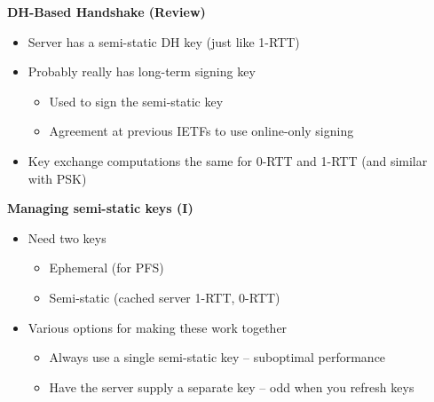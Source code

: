 \documentclass[helvetica]{seminar}
\newcommand{\heading}[1]{%
  \begin{center} 
    \large\bf 
    #1 
  \end{center} 
  \vspace{.4 in}}
\begin{document}
\begin{slide}
\heading{DH-Based Handshake (Review)}

\begin{itemize}
\item Server has a semi-static DH key (just like 1-RTT)
\item Probably really has long-term signing key
  \begin{itemize}
  \item Used to sign the semi-static key
  \item Agreement at previous IETFs to use online-only signing
  \end{itemize}

\item Key exchange computations the same for 0-RTT and 1-RTT (and similar with PSK)
\end{itemize}
\end{slide}



\begin{slide}
\heading{Managing semi-static keys (I)}

\begin{itemize}
\item Need two keys
  \begin{itemize}
  \item Ephemeral (for PFS)
  \item Semi-static (cached server 1-RTT, 0-RTT)
  \end{itemize}

\item Various options for making these work together
  \begin{itemize}
  \item Always use a single semi-static key -- suboptimal performance
  \item Have the server supply a separate key -- odd when you refresh keys
  \end{itemize}
\end{itemize}
\end{slide}
\end{document}
